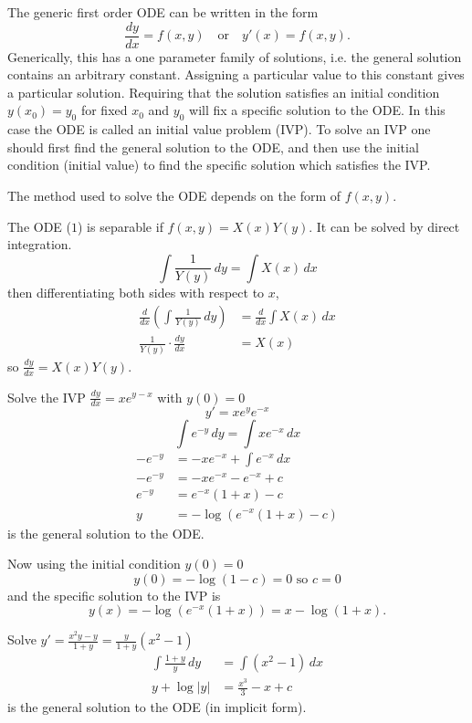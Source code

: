 \documentclass[10pt, a4paper]{article}
\begin{document}
The generic first order ODE can be written in the form
\begin{equation}
    \frac{dy}{dx} = f(x, y)\quad\text{or}\quad y'(x) = f(x, y).
\end{equation}
Generically,
this has a one parameter family of solutions,
i.e. the general solution contains an arbitrary constant.
Assigning a particular value to this constant gives a particular solution.
Requiring that the solution satisfies an initial condition $y(x_0) = y_0$ for fixed $x_0$ and $y_0$ will fix a specific solution to the ODE.
In this case the ODE is called an initial value problem
(IVP).
To solve an IVP one should first find the general solution to the ODE,
and then use the initial condition
(initial value)
to find the specific solution which satisfies the IVP.

The method used to solve the ODE depends on the form of $f(x, y)$.

The ODE ($1$) is separable if $f(x, y) = X(x)Y(y)$.
It can be solved by direct integration.
\[
\int\frac{1}{Y(y)}\,dy = \int X(x)\,dx
\]
then differentiating both sides with respect to $x$,
\begin{align*}
    \frac{d}{dx}\left(\int\frac{1}{Y(y)}\,dy\right) &= \frac{d}{dx}\int X(x)\,dx \\
    \frac{1}{Y(y)} \cdot \frac{dy}{dx} &= X(x)
\end{align*}
so $\frac{dy}{dx} = X(x)Y(y)$.

\begin{example}
    Solve the IVP $\frac{dy}{dx} = xe ^ {y - x}$ with $y(0) = 0$
    \[
    y' = xe ^ y e ^ {-x}
    \]
    \[
    \int e ^ {-y}\,dy = \int xe ^ {-x}\,dx
    \]
    \begin{align*}
    -e ^ {-y} &=  -xe ^ {-x} + \int e ^ {-x}\,dx \\
    -e ^ {-y} &= -xe ^ {-x} - e ^ {-x} + c \\
    e ^ {-y} &= e ^ {-x}(1 + x) - c \\
    y &= -\log(e ^ {-x}(1 + x) - c)
    \end{align*}
    is the general solution to the ODE.
    
    Now using the initial condition $y(0) = 0$
    \[
    y(0) = -\log(1 - c) = 0 \text{ so } c = 0
    \]
    and the specific solution to the IVP is
    \[
    y(x) = -\log(e ^ {-x}(1 + x)) = x - \log(1 + x).
    \]
\end{example}

\begin{example}
    Solve $y' = \frac{x ^ 2 y - y}{1 + y} = \frac{y}{1 + y}(x ^ 2 - 1)$
    \begin{align*}
        \int\frac{1 + y}{y}\,dy &= \int(x ^ 2 - 1)\,dx \\
        y + \log|y| &= \frac{x ^ 3}{3} - x + c
    \end{align*}
    is the general solution to the ODE
    (in implicit form).
\end{example}
\end{document}
